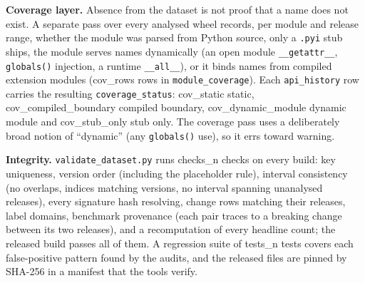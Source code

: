\documentclass[10pt,twocolumn,letterpaper]{article}
\begin{document}
\textbf{Coverage layer.} Absence from the dataset is not proof that a name does not exist. A separate pass over every
analysed wheel records, per module and release range, whether the module was parsed from Python source, only a
\texttt{.pyi} stub ships, the module serves names dynamically (an open module \texttt{\_\_getattr\_\_},
\texttt{globals()} injection, a runtime \texttt{\_\_all\_\_}), or it binds names from compiled extension modules
({{cov_rows}} rows in \texttt{module\_coverage}). Each \texttt{api\_history} row carries the resulting
\texttt{coverage\_status}: {{cov_static}} static, {{cov_compiled_boundary}} compiled boundary, {{cov_dynamic_module}}
dynamic module and {{cov_stub_only}} stub only. The coverage pass uses a deliberately broad notion of ``dynamic'' (any
\texttt{globals()} use), so it errs toward warning.

\textbf{Integrity.} \texttt{validate\_dataset.py} runs {{checks_n}} checks on every build: key uniqueness, version order
(including the placeholder rule), interval consistency (no overlaps, indices matching versions, no interval spanning
unanalysed releases), every signature hash resolving, change rows matching their releases, label domains, benchmark
provenance (each pair traces to a breaking change between its two releases), and a recomputation of every headline
count; the released build passes all of them. A regression suite of {{tests_n}} tests covers each false-positive pattern
found by the audits, and the released files are pinned by SHA-256 in a manifest that the tools verify.
\end{document}
